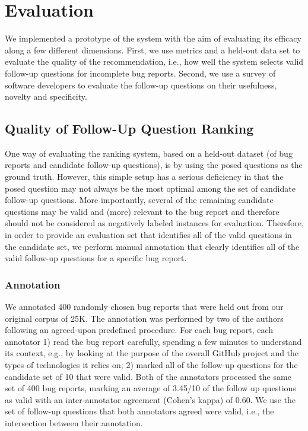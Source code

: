 \section{Evaluation}

We implemented a prototype of the system with the aim of evaluating its efficacy along
a few different dimensions. First, we use metrics and a held-out data set to evaluate the quality
of the recommendation, i.e., how well the system selects valid follow-up questions for incomplete bug reports.
Second, we use a survey of software developers to evaluate the follow-up questions on their usefulness, novelty and specificity.


\subsection{Quality of Follow-Up Question Ranking}

One way of evaluating the ranking system, based on a held-out dataset (of bug reports and candidate follow-up questions), is
by using the posed questions as the ground truth. However, this simple setup has a serious deficiency in that the posed question
may not always be the most optimal among the set of candidate follow-up questions. More importantly, several of
the remaining candidate questions may be valid and (more) relevant to the bug report and therefore should
not be considered as negatively labeled instances for evaluation. Therefore, in order to provide an evaluation
set that identifies all of the valid questions in the candidate set, we perform manual annotation that clearly
identifies all of the valid follow-up questions for a specific bug report.

\subsubsection{Annotation}
We annotated 400 randomly chosen bug reports that were held out from our original corpus of 25K. The annotation
was performed by two of the authors following an agreed-upon predefined procedure. For each bug report, each annotator 1)
read the bug report carefully, spending a few minutes to understand its context, e.g., by looking at the purpose of the overall GitHub
project and the types of technologies it relies on; 2) marked all of the follow-up questions for the candidate set of 10
that were valid. Both of the annotators processed the same set of 400 bug reports, marking an average of 3.45/10 of the follow up questions as valid with an inter-annotator agreement (Cohen's kappa) of 0.60.
We use the set of follow-up questions that both annotators agreed were valid, i.e., the intersection between their annotation.

